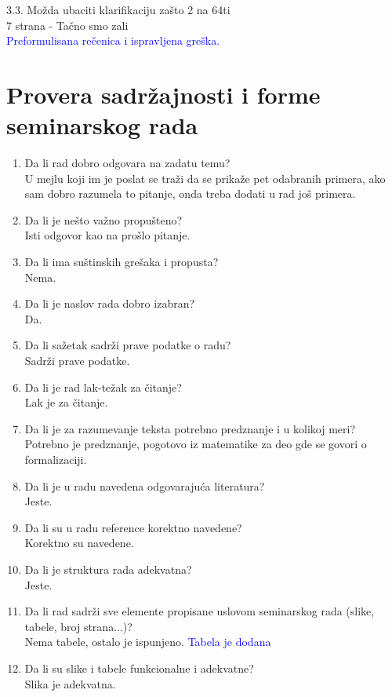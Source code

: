 \documentclass[a4paper]{report}
\newcommand{\odgovor}[1]{\textcolor{blue}{#1}}
\begin{document}
3.3. Možda ubaciti klarifikaciju zašto 2 na 64ti \\
7 strana - Tačno smo zali 
\\
\odgovor{Preformulisana rečenica i ispravljena greška.} \\
\section{Provera sadržajnosti i forme seminarskog rada}

\begin{enumerate}
\item Da li rad dobro odgovara na zadatu temu?\\
U mejlu koji im je poslat se traži  da se prikaže pet odabranih primera, ako sam dobro razumela to pitanje, onda treba dodati u rad još primera.   

\item Da li je nešto važno propušteno?\\
Isti odgovor kao na prošlo pitanje.

\item Da li ima suštinskih grešaka i propusta?\\
Nema.

\item Da li je naslov rada dobro izabran?\\
Da.

\item Da li sažetak sadrži prave podatke o radu?\\
Sadrži prave podatke.

\item Da li je rad lak-težak za čitanje?\\
Lak je za čitanje.

\item Da li je za razumevanje teksta potrebno predznanje i u kolikoj meri?\\
Potrebno je predznanje, pogotovo iz matematike za deo gde se govori o formalizaciji.

\item Da li je u radu navedena odgovarajuća literatura?\\
Jeste.

\item Da li su u radu reference korektno navedene?\\
Korektno su navedene.

\item Da li je struktura rada adekvatna?\\
Jeste.

\item Da li rad sadrži sve elemente propisane uslovom seminarskog rada (slike, tabele, broj strana...)?\\
Nema tabele, ostalo je ispunjeno.
\odgovor{Tabela je dodana}

\item Da li su slike i tabele funkcionalne i adekvatne?\\
Slika je adekvatna.
\end{enumerate}
\end{document}
